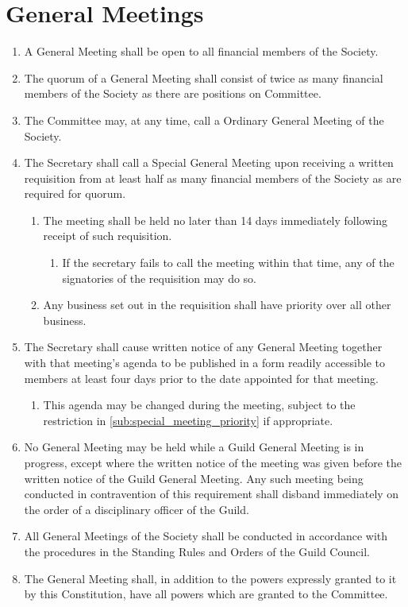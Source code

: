 \documentclass[a4paper]{article}
\begin{document}
\section{General Meetings}
\begin{enumerate}
	\item A General Meeting shall be open to all financial members of the Society.
	\item The quorum of a General Meeting shall consist of twice as many financial members of the Society as there are positions on Committee.
    \item The Committee may, at any time, call a Ordinary General Meeting of the Society.
    \item The Secretary shall call a Special General Meeting upon receiving a written requisition from at least half as many financial members of the Society as are required for quorum.
    \begin{enumerate}
        \item The meeting shall be held no later than 14 days immediately following receipt of such requisition. 
        \begin{enumerate}
            \item If the secretary fails to call the meeting within that time, any of the signatories of the requisition may do so.
        \end{enumerate}
        \item \label{sub:special_meeting_priority} Any business set out in the requisition shall have priority over all other business. 
    \end{enumerate}
    \item The Secretary shall cause written notice of any General Meeting together with that meeting's agenda to be published in a form readily accessible to members at least four days prior to the date appointed for that meeting.
    \begin{enumerate}
        \item This agenda may be changed during the meeting, subject to the restriction in \cref{sub:special_meeting_priority} if appropriate.
    \end{enumerate}
    \item No General Meeting may be held while a Guild General Meeting is in progress, except where the written notice of the meeting was given before the written notice of the Guild General Meeting. Any such meeting being conducted in contravention of this requirement shall disband immediately on the order of a disciplinary officer of the Guild.
    \item All General Meetings of the Society shall be conducted in accordance with the procedures in the Standing Rules and Orders of the Guild Council.
    \item The General Meeting shall, in addition to the powers expressly granted to it by this Constitution, have all powers which are granted to the Committee.
\end{enumerate}
\end{document}

